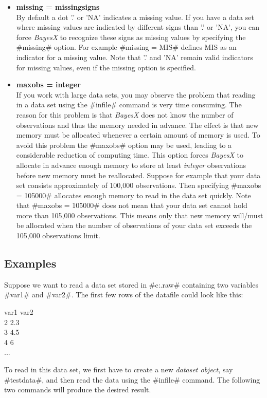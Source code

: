 \begin{itemize}
\item {\bf missing = missingsigns} \\
By default a dot '.' or 'NA' indicates a missing value. If you
have a data set where missing values are indicated by different
signs than '.' or 'NA', you can force {\em BayesX} to recognize
these signs as missing values by specifying the #missing# option.
For example #missing = MIS# defines MIS as an indicator for a
missing value. Note that
 '.' and 'NA' remain valid indicators for missing values, even if the missing
option is specified.

\item {\bf maxobs = integer} \\
If you work with large data sets, you may observe the problem that
reading in a data set using the #infile# command is very time
consuming. The reason for this problem is that {\em BayesX} does
not know the number of observations and thus the memory needed in
advance. The effect is that new memory must be allocated whenever
a certain amount of memory is used. To avoid this problem the
#maxobs# option may be used, leading to a considerable reduction
of computing time. This option forces {\em BayesX} to allocate in
advance enough memory  to store at least {\em integer}
observations before new memory must be reallocated. Suppose for
example that your data set consists approximately of 100,000
observations. Then specifying #maxobs = 105000# allocates enough
memory to read in the data set quickly. Note that #maxobs = 105000#
does not mean that your data set cannot hold more than
105,000 observations. This means only that new memory will/must be
allocated when the number of observations of your data set exceeds
the 105,000 observations limit.
\end{itemize}


\subsection*{Examples}

Suppose we want to read a data set stored in
#c:\data\testdata.raw# containing two
variables #var1# and #var2#.
The first few rows of the datafile could look like this:

var1 var2 \\
2 2.3 \\
3 4.5 \\
4 6 \\
...


To read in this data set, we first have to create a new {\em dataset
object}, say #testdata#, and then read the data using
the #infile# command. The following two commands will produce the desired result.

